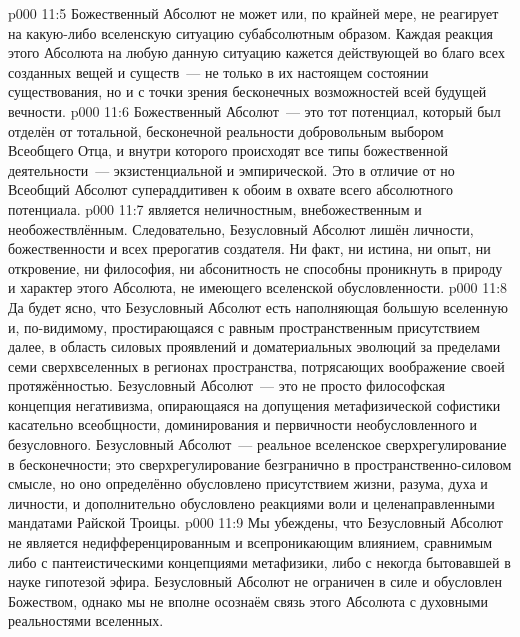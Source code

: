 \vs p000 11:5 Божественный Абсолют не может или, по крайней мере, не реагирует на какую\hyp{}либо вселенскую ситуацию субабсолютным образом. Каждая реакция этого Абсолюта на любую данную ситуацию кажется действующей во благо всех созданных вещей и существ~--- не только в их настоящем состоянии существования, но и с точки зрения бесконечных возможностей всей будущей вечности.
\vs p000 11:6 Божественный Абсолют~--- это тот потенциал, который был отделён от тотальной, бесконечной реальности добровольным выбором Всеобщего Отца, и внутри которого происходят все типы божественной деятельности~--- экзистенциальной и эмпирической. Это  в отличие от  но Всеобщий Абсолют супераддитивен к обоим в охвате всего абсолютного потенциала.
\vs p000 11:7 \pc {} является неличностным, внебожественным и необожествлённым. Следовательно, Безусловный Абсолют лишён личности, божественности и всех прерогатив создателя. Ни факт, ни истина, ни опыт, ни откровение, ни философия, ни абсонитность не способны проникнуть в природу и характер этого Абсолюта, не имеющего вселенской обусловленности.
\vs p000 11:8 Да будет ясно, что Безусловный Абсолют есть  наполняющая большую вселенную и, по\hyp{}видимому, простирающаяся с равным пространственным присутствием далее, в область силовых проявлений и доматериальных эволюций за пределами семи сверхвселенных в регионах пространства, потрясающих воображение своей протяжённостью. Безусловный Абсолют~--- это не просто философская концепция негативизма, опирающаяся на допущения метафизической софистики касательно всеобщности, доминирования и первичности необусловленного и безусловного. Безусловный Абсолют~--- реальное вселенское сверхрегулирование в бесконечности; это сверхрегулирование безгранично в пространственно\hyp{}силовом смысле, но оно определённо обусловлено присутствием жизни, разума, духа и личности, и дополнительно обусловлено реакциями воли и целенаправленными мандатами Райской Троицы.
\vs p000 11:9 Мы убеждены, что Безусловный Абсолют не является недифференцированным и всепроникающим влиянием, сравнимым либо с пантеистическими концепциями метафизики, либо с некогда бытовавшей в науке гипотезой эфира. Безусловный Абсолют не ограничен в силе и обусловлен Божеством, однако мы не вполне осознаём связь этого Абсолюта с духовными реальностями вселенных.
